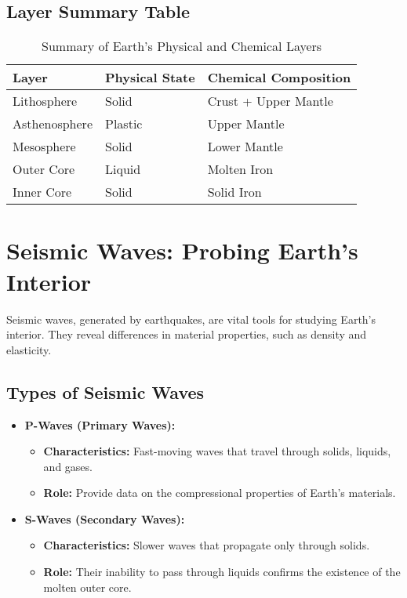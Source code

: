 \documentclass{article}
\begin{document}
\subsection*{Layer Summary Table}

\begin{table}[h!]
\centering
\begin{tabular}{|l|l|l|}
\hline
\textbf{Layer} & \textbf{Physical State} & \textbf{Chemical Composition} \\
\hline
Lithosphere & Solid & Crust + Upper Mantle \\
Asthenosphere & Plastic & Upper Mantle \\
Mesosphere & Solid & Lower Mantle \\
Outer Core & Liquid & Molten Iron \\
Inner Core & Solid & Solid Iron \\
\hline
\end{tabular}
\caption{Summary of Earth's Physical and Chemical Layers}
\end{table}

\section*{Seismic Waves: Probing Earth's Interior}

Seismic waves, generated by earthquakes, are vital tools for studying Earth's interior. They reveal differences in material properties, such as density and elasticity.

\subsection*{Types of Seismic Waves}
\begin{itemize}
    \item \textbf{P-Waves (Primary Waves):}
        \begin{itemize}
            \item \textbf{Characteristics:} Fast-moving waves that travel through solids, liquids, and gases.
            \item \textbf{Role:} Provide data on the compressional properties of Earth's materials.
        \end{itemize}
    \item \textbf{S-Waves (Secondary Waves):}
        \begin{itemize}
            \item \textbf{Characteristics:} Slower waves that propagate only through solids.
            \item \textbf{Role:} Their inability to pass through liquids confirms the existence of the molten outer core.
        \end{itemize}
\end{itemize}
\end{document}
